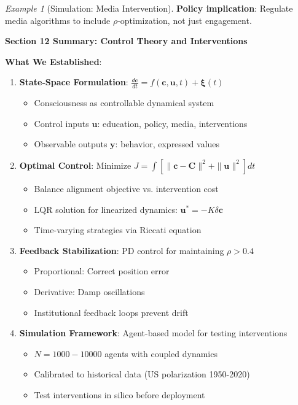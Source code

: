 \documentclass[11pt,a4paper]{article}
\theoremstyle{definition}
\theoremstyle{remark}
\newtheorem{example}{Example}[section]
\newcommand{\cc}{\mathbf{c}}
\begin{document}
\begin{small}
\begin{enumerate}
\begin{example}[Simulation: Media Intervention]
\textbf{Policy implication}: Regulate media algorithms to include \(\rho\)-optimization, not just engagement.
\end{example}

\begin{mdframed}[backgroundcolor=green!10,linewidth=2pt,linecolor=green!70!black]
\textbf{Section 12 Summary: Control Theory and Interventions}

\textbf{What We Established}:
\begin{enumerate}[nosep]
    \item \textbf{State-Space Formulation}: \(\frac{d\cc}{dt} = f(\cc, \mathbf{u}, t) + \boldsymbol{\xi}(t)\)
        \begin{itemize}[nosep]
            \item Consciousness as controllable dynamical system
            \item Control inputs \(\mathbf{u}\): education, policy, media, interventions
            \item Observable outputs \(\mathbf{y}\): behavior, expressed values
        \end{itemize}
    
    \item \textbf{Optimal Control}: Minimize \(J = \int [\|\cc - \mathbf{C}\|^2 + \|\mathbf{u}\|^2] dt\)
        \begin{itemize}[nosep]
            \item Balance alignment objective vs. intervention cost
            \item LQR solution for linearized dynamics: \(\mathbf{u}^* = -K\delta\cc\)
            \item Time-varying strategies via Riccati equation
        \end{itemize}
    
    \item \textbf{Feedback Stabilization}: PD control for maintaining \(\rho > 0.4\)
        \begin{itemize}[nosep]
            \item Proportional: Correct position error
            \item Derivative: Damp oscillations
            \item Institutional feedback loops prevent drift
        \end{itemize}
    
    \item \textbf{Simulation Framework}: Agent-based model for testing interventions
        \begin{itemize}[nosep]
            \item \(N = 1000-10000\) agents with coupled dynamics
            \item Calibrated to historical data (US polarization 1950-2020)
            \item Test interventions in silico before deployment
        \end{itemize}
\end{enumerate}


\end{mdframed}
\end{enumerate}
\end{small}
\end{document}
